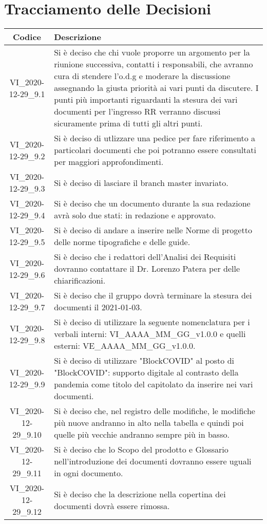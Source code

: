 \section*{Tracciamento delle Decisioni}

\begin{center}
	\begin{longtable}{|c|p{13cm}|}
	\hline
	\rowcolor{lighter-grayer}
	\textbf{Codice} & \textbf{Descrizione} \\
	\hline
	\endfirsthead

	\hline
	VI\_2020-12-29\_9.1 &  Si è deciso che chi vuole proporre un argomento per la riunione successiva, contatti i responsabili, che avranno cura di stendere l'o.d.g e moderare la discussione assegnando la giusta priorità ai vari punti da discutere.
	I punti più importanti riguardanti la stesura dei vari documenti per l'ingresso RR verranno discussi sicuramente prima di tutti gli altri punti.\\
	VI\_2020-12-29\_9.2 & Si è deciso di utlizzare una \ped{D} pedice per fare riferimento a particolari documenti che poi potranno essere consultati per maggiori approfondimenti. \\
	VI\_2020-12-29\_9.3 & Si è deciso di lasciare il branch master invariato. \\
	VI\_2020-12-29\_9.4 & Si è deciso che un documento durante la sua redazione avrà solo due stati: in redazione e approvato. \\
	VI\_2020-12-29\_9.5 & Si è deciso di andare a inserire nelle Norme di progetto\ped{D} delle norme tipografiche e delle guide. \\
	VI\_2020-12-29\_9.6 & Si è deciso che i redattori dell'Analisi dei Requisiti\ped{D} dovranno contattare il Dr. Lorenzo Patera per delle chiarificazioni. \\
	VI\_2020-12-29\_9.7 & Si è deciso che il gruppo dovrà terminare la stesura dei documenti il 2021-01-03. \\
	VI\_2020-12-29\_9.8 & Si è deciso di utilizzare la seguente nomenclatura per i verbali interni: VI\_AAAA\_MM\_GG\_v1.0.0 e quelli esterni:  VE\_AAAA\_MM\_GG\_v1.0.0. \\
	VI\_2020-12-29\_9.9 & Si è deciso di utilizzare "BlockCOVID" al posto di "BlockCOVID": supporto digitale al contrasto della pandemia come titolo del capitolato da inserire nei vari documenti. \\
	VI\_2020-12-29\_9.10 & Si è deciso che, nel registro delle modifiche, le modifiche più nuove andranno in alto nella tabella e quindi poi quelle più vecchie andranno sempre più in basso.\\
	VI\_2020-12-29\_9.11 & Si è deciso che lo Scopo del prodotto e Glossario nell'introduzione dei documenti dovranno essere uguali in ogni documento. \\
	VI\_2020-12-29\_9.12 & Si è deciso che la descrizione nella copertina dei documenti dovrà essere rimossa.\\
	\hline
	\end{longtable}
\end{center}

